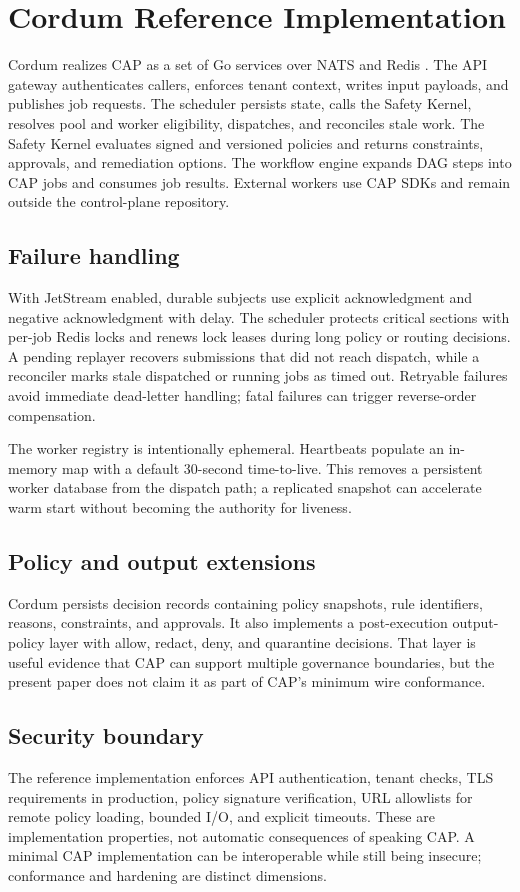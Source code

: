 \section{Cordum Reference Implementation}

Cordum realizes CAP as a set of Go services over NATS and Redis \citep{cordum_current}. The API gateway authenticates callers, enforces tenant context, writes input payloads, and publishes job requests. The scheduler persists state, calls the Safety Kernel, resolves pool and worker eligibility, dispatches, and reconciles stale work. The Safety Kernel evaluates signed and versioned policies and returns constraints, approvals, and remediation options. The workflow engine expands DAG steps into CAP jobs and consumes job results. External workers use CAP SDKs and remain outside the control-plane repository.

\subsection{Failure handling}

With JetStream enabled, durable subjects use explicit acknowledgment and negative acknowledgment with delay. The scheduler protects critical sections with per-job Redis locks and renews lock leases during long policy or routing decisions. A pending replayer recovers submissions that did not reach dispatch, while a reconciler marks stale dispatched or running jobs as timed out. Retryable failures avoid immediate dead-letter handling; fatal failures can trigger reverse-order compensation.

The worker registry is intentionally ephemeral. Heartbeats populate an in-memory map with a default 30-second time-to-live. This removes a persistent worker database from the dispatch path; a replicated snapshot can accelerate warm start without becoming the authority for liveness.

\subsection{Policy and output extensions}

Cordum persists decision records containing policy snapshots, rule identifiers, reasons, constraints, and approvals. It also implements a post-execution output-policy layer with allow, redact, deny, and quarantine decisions. That layer is useful evidence that CAP can support multiple governance boundaries, but the present paper does not claim it as part of CAP's minimum wire conformance.

\subsection{Security boundary}

The reference implementation enforces API authentication, tenant checks, TLS requirements in production, policy signature verification, URL allowlists for remote policy loading, bounded I/O, and explicit timeouts. These are implementation properties, not automatic consequences of speaking CAP. A minimal CAP implementation can be interoperable while still being insecure; conformance and hardening are distinct dimensions.
